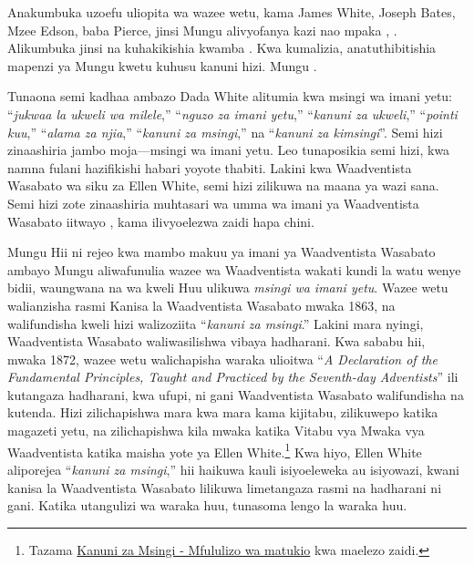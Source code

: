 Anakumbuka uzoefu uliopita wa wazee wetu, kama James White, Joseph Bates, Mzee Edson, baba Pierce, jinsi Mungu alivyofanya kazi nao mpaka , . Alikumbuka jinsi  na kuhakikishia kwamba . Kwa kumalizia, anatuthibitishia mapenzi ya Mungu kwetu kuhusu kanuni hizi. Mungu .

Tunaona semi kadhaa ambazo Dada White alitumia kwa msingi wa imani yetu: “\textit{jukwaa la ukweli wa milele},” “\textit{nguzo za imani yetu},” “\textit{kanuni za ukweli},” “\textit{pointi kuu},” “\textit{alama za njia},” “\textit{kanuni za msingi},” na “\textit{kanuni za kimsingi}”. Semi hizi zinaashiria jambo moja—msingi wa imani yetu. Leo tunaposikia semi hizi, kwa namna fulani hazifikishi habari yoyote thabiti. Lakini kwa Waadventista Wasabato wa siku za Ellen White, semi hizi zilikuwa na maana ya wazi sana. Semi hizi zote zinaashiria muhtasari wa umma wa imani ya Waadventista Wasabato iitwayo , kama ilivyoelezwa zaidi hapa chini.

Mungu  Hii ni rejeo kwa mambo makuu ya imani ya Waadventista Wasabato ambayo Mungu aliwafunulia wazee wa Waadventista  wakati kundi la watu wenye bidii, waungwana na wa kweli  Huu ulikuwa \textit{msingi wa imani yetu}. Wazee wetu walianzisha rasmi Kanisa la Waadventista Wasabato mwaka 1863, na walifundisha kweli hizi walizoziita “\textit{kanuni za msingi}.” Lakini mara nyingi, Waadventista Wasabato waliwasilishwa vibaya hadharani. Kwa sababu hii, mwaka 1872, wazee wetu walichapisha waraka ulioitwa “\textit{A Declaration of the Fundamental Principles, Taught and Practiced by the Seventh-day Adventists}” ili kutangaza hadharani, kwa ufupi, ni  gani Waadventista Wasabato walifundisha na kutenda. Hizi  zilichapishwa mara kwa mara kama kijitabu, zilikuwepo katika magazeti yetu, na zilichapishwa kila mwaka katika Vitabu vya Mwaka vya Waadventista katika maisha yote ya Ellen White.\footnote{Tazama \hyperref[appendix:timeline]{Kanuni za Msingi - Mfululizo wa matukio} kwa maelezo zaidi.} Kwa hiyo, Ellen White aliporejea “\textit{kanuni za msingi},” hii haikuwa kauli isiyoeleweka au isiyowazi, kwani kanisa la Waadventista Wasabato lilikuwa limetangaza rasmi na hadharani ni  gani. Katika utangulizi wa waraka huu, tunasoma lengo la waraka huu.

